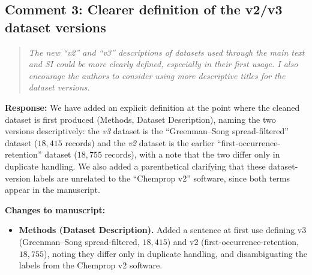 \documentclass[11pt]{article}
\newenvironment{reviewer}{%
  \begin{quote}\itshape\color{black!70}}{%
  \end{quote}}
\newcommand{\response}[1]{\noindent\textbf{Response:} #1\par\medskip}
\newenvironment{changes}{%
  \noindent\textbf{Changes to manuscript:}
  \begin{itemize}[leftmargin=2em,itemsep=2pt]}{%
  \end{itemize}\medskip}
\begin{document}
\subsection*{Comment 3: Clearer definition of the v2/v3 dataset versions}
\begin{reviewer}
The new ``v2'' and ``v3'' descriptions of datasets used through the main text and SI could be more clearly defined, especially in their first usage. I also encourage the authors to consider using more descriptive titles for the dataset versions.
\end{reviewer}
\response{We have added an explicit definition at the point where the cleaned dataset is first produced (Methods, Dataset Description), naming the two versions descriptively: the \emph{v3} dataset is the ``Greenman--Song spread-filtered'' dataset ($18{,}415$ records) and the \emph{v2} dataset is the earlier ``first-occurrence-retention'' dataset ($18{,}755$ records), with a note that the two differ only in duplicate handling. We also added a parenthetical clarifying that these dataset-version labels are unrelated to the ``Chemprop v2'' software, since both terms appear in the manuscript.}
\begin{changes}
  \item \textbf{Methods (Dataset Description).} Added a sentence at first use defining v3 (Greenman--Song spread-filtered, $18{,}415$) and v2 (first-occurrence-retention, $18{,}755$), noting they differ only in duplicate handling, and disambiguating the labels from the Chemprop v2 software.
\end{changes}
\end{document}
